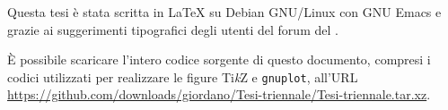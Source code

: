 \thispagestyle{empty}
\hfill
\vfill
Questa tesi è stata scritta in \LaTeX{} su Debian GNU/Linux con GNU Emacs e
grazie ai suggerimenti tipografici degli utenti del forum del \GuIT.

È possibile scaricare l'intero codice sorgente di questo documento, compresi i
codici utilizzati per realizzare le figure Ti\emph{k}Z e \texttt{gnuplot},
all'URL
\url{https://github.com/downloads/giordano/Tesi-triennale/Tesi-triennale.tar.xz}.

